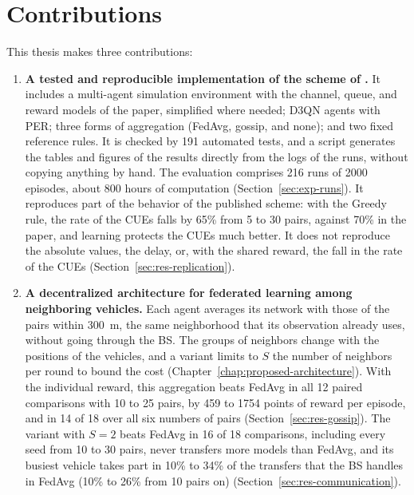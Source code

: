 \section{Contributions}
\label{sec:intro-contributions}

This thesis makes three contributions:

\begin{enumerate}
  \item \textbf{A tested and reproducible implementation of the scheme of \citet{li+22fedmarl}.} It includes
    a multi-agent simulation environment with the channel, queue, and reward models of the paper, simplified
    where needed; \ac{D3QN} agents with \ac{PER}; three forms of aggregation (\ac{FedAvg}, gossip, and none);
    and two fixed reference rules. It is checked by 191 automated tests, and a script generates the tables
    and figures of the results directly from the logs of the runs, without copying anything by hand. The
    evaluation comprises 216 runs of 2000 episodes, about 800 hours of computation
    (Section~\ref{sec:exp-runs}). It reproduces part of the behavior of the published scheme: with the Greedy rule, the rate of the
    \acp{CUE} falls by 65\% from 5 to 30 pairs, against 70\% in the paper, and learning protects the
    \acp{CUE} much better. It does not reproduce the absolute values, the delay, or, with the shared reward,
    the fall in the rate of the \acp{CUE} (Section~\ref{sec:res-replication}).

  \item \textbf{A decentralized architecture for federated learning among neighboring vehicles.} Each agent
    averages its network with those of the pairs within \SI{300}{\meter}, the same neighborhood that its
    observation already uses, without going through the \ac{BS}. The groups of neighbors change with the
    positions of the vehicles, and a variant limits to $S$ the number of neighbors per round to bound the
    cost (Chapter~\ref{chap:proposed-architecture}). With the individual reward, this aggregation beats
    \ac{FedAvg} in all 12 paired comparisons with 10 to 25 pairs, by 459 to 1754 points of reward per
    episode, and in 14 of 18 over all six numbers of pairs (Section~\ref{sec:res-gossip}). The variant with
    $S = 2$ beats \ac{FedAvg} in 16 of 18 comparisons, including every seed from 10 to 30 pairs, never
    transfers more models than \ac{FedAvg}, and its busiest vehicle takes part in 10\% to 34\% of the
    transfers that the \ac{BS} handles in \ac{FedAvg} (10\% to 26\% from 10 pairs on)
    (Section~\ref{sec:res-communication}).


\end{enumerate}
